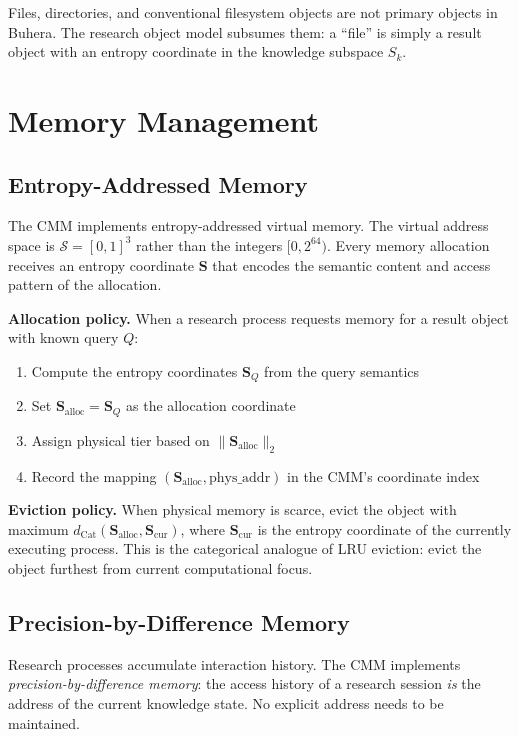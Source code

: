 \documentclass[12pt,twocolumn]{article}
\DeclareMathOperator{\Cat}{Cat}
\begin{document}
Files, directories, and conventional filesystem objects are not primary objects in Buhera. The research object model subsumes them: a ``file'' is simply a result object with an entropy coordinate in the knowledge subspace $S_k$.

\section{Memory Management}
\label{sec:memory}

\subsection{Entropy-Addressed Memory}

The CMM implements entropy-addressed virtual memory. The virtual address space is $\mathcal{S} = [0,1]^3$ rather than the integers $[0, 2^{64})$. Every memory allocation receives an entropy coordinate $\mathbf{S}$ that encodes the semantic content and access pattern of the allocation.

\textbf{Allocation policy.} When a research process requests memory for a result object with known query $Q$:
\begin{enumerate}
\item Compute the entropy coordinates $\mathbf{S}_Q$ from the query semantics
\item Set $\mathbf{S}_{\text{alloc}} = \mathbf{S}_Q$ as the allocation coordinate
\item Assign physical tier based on $\|\mathbf{S}_{\text{alloc}}\|_2$
\item Record the mapping $(\mathbf{S}_{\text{alloc}}, \text{phys\_addr})$ in the CMM's coordinate index
\end{enumerate}

\textbf{Eviction policy.} When physical memory is scarce, evict the object with maximum $d_{\Cat}(\mathbf{S}_{\text{alloc}}, \mathbf{S}_{\text{cur}})$, where $\mathbf{S}_{\text{cur}}$ is the entropy coordinate of the currently executing process. This is the categorical analogue of LRU eviction: evict the object furthest from current computational focus.

\subsection{Precision-by-Difference Memory}

Research processes accumulate interaction history. The CMM implements \emph{precision-by-difference memory}: the access history of a research session \emph{is} the address of the current knowledge state. No explicit address needs to be maintained.
\end{document}
